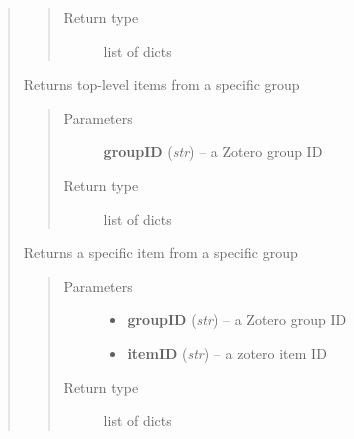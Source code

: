 \documentclass[letterpaper,10pt,english]{sphinxmanual}
\begin{document}
\begin{quote}
\begin{fulllineitems}
\begin{quote}
\begin{description}
\item[{Return type}] \leavevmode
list of dicts

\end{description}\end{quote}

\end{fulllineitems}



\begin{fulllineitems}
\label{index:pyzotero.zotero.Zotero.group_top}
Returns top-level items from a specific group
\begin{quote}\begin{description}
\item[{Parameters}] \leavevmode
\textbf{groupID} (\emph{str}) -- a Zotero group ID

\item[{Return type}] \leavevmode
list of dicts

\end{description}\end{quote}

\end{fulllineitems}



\begin{fulllineitems}
\label{index:pyzotero.zotero.Zotero.group_item}
Returns a specific item from a specific group
\begin{quote}\begin{description}
\item[{Parameters}] \leavevmode\begin{itemize}
\item {} 
\textbf{groupID} (\emph{str}) -- a Zotero group ID

\item {} 
\textbf{itemID} (\emph{str}) -- a zotero item ID

\end{itemize}

\item[{Return type}] \leavevmode
list of dicts

\end{description}\end{quote}


\end{fulllineitems}
\end{quote}
\end{document}
